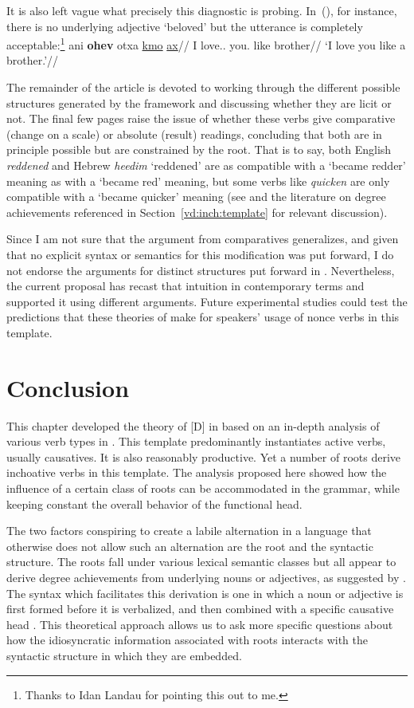 It is also left vague what precisely this diagnostic is probing. In~(\nextx), for instance, there is no underlying adjective `beloved' but the utterance is completely acceptable:\footnote{Thanks to Idan Landau for pointing this out to me.}
\ex
	\begingl
	\gla ani \textbf{ohev} otxa \underline{kmo} \underline{ax}//
	\glb I love.. you. like brother//
	\glft `I love you like a brother.'//
	\endgl
\xe

The remainder of the article is devoted to working through the different possible structures generated by the framework and discussing whether they are licit or not. The final few pages \citep[150]{borer91} raise the issue of whether these verbs give comparative (change on a scale) or absolute (result) readings, concluding that both are in principle possible but are constrained by the root. That is to say, both English \emph{reddened} and Hebrew \emph{heedim} `reddened' are as compatible with a `became redder' meaning as with a `became red' meaning, but some verbs like \emph{quicken} are only compatible with a `became quicker' meaning (see \citealt[ch.~5]{bobaljik12} and the literature on degree achievements referenced in Section~\ref{vd:inch:template} for relevant discussion).

Since I am not sure that the argument from comparatives generalizes, and given that no explicit syntax or semantics for this modification was put forward, I do not endorse the arguments for distinct structures put forward in \cite{borer91}. Nevertheless, the current proposal has recast that intuition in contemporary terms and supported it using different arguments. Future experimental studies could test the predictions that these theories of {\thif} make for speakers' usage of nonce verbs in this template.


\section{Conclusion} \label{vd:sum}
This chapter developed the theory of [D] in {\vd} based on an in-depth analysis of various verb types in {\thif}. This template predominantly instantiates active verbs, usually causatives. It is also reasonably productive. Yet a number of roots derive inchoative verbs in this template. The analysis proposed here showed how the influence of a certain class of roots can be accommodated in the grammar, while keeping constant the overall behavior of the functional head.

The two factors conspiring to create a labile alternation in a language that otherwise does not allow such an alternation are the root and the syntactic structure. The roots fall under various lexical semantic classes but all appear to derive degree achievements from underlying nouns or adjectives, as suggested by \cite{lev16}. The syntax which facilitates this derivation is one in which a noun or adjective is first formed before it is verbalized, and then combined with a specific causative head {\vd}. This theoretical approach allows us to ask more specific questions about how the idiosyncratic information associated with roots interacts with the syntactic structure in which they are embedded.

